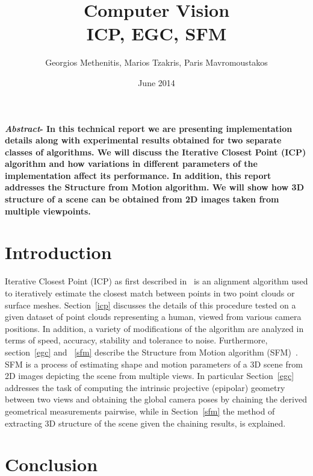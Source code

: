 \documentclass[11pt,twocolumn]{article}
\title{Computer Vision\\ICP, EGC, SFM}
\author{Georgios Methenitis, Marios Tzakris, Paris Mavromoustakos}
\affil{University of Amsterdam}
\date{June 2014}
\begin{document}
\maketitle

\renewcommand{\labelenumi}{\alph{enumi}.}

\textbf{\textit{Abstract}- In this technical report we are presenting implementation details along with experimental results obtained for two separate classes of algorithms. We will discuss the Iterative Closest Point (ICP) algorithm and how variations in different parameters of the implementation affect its performance. In addition, this report addresses the Structure from Motion algorithm. We will show how 3D structure of a scene can be obtained from 2D images taken from multiple viewpoints.}

\section{Introduction}
\label{introduction}
Iterative Closest Point (ICP) as first described in~\cite{icp} is an alignment algorithm used to iteratively estimate the closest match between points in two point clouds or surface meshes. Section~\ref{icp} discusses the details of this procedure tested on a given dataset of point clouds representing a human, viewed from various camera positions. In addition, a variety of modifications of the algorithm are analyzed in terms of speed, accuracy, stability and tolerance to noise.
Furthermore, section~\ref{egc} and ~\ref{sfm} describe the Structure from Motion algorithm (SFM)~\cite{egc}. SFM is a process of estimating shape and motion parameters of a 3D scene from 2D images depicting the scene from multiple views. In particular Section~\ref{egc} addresses the task of computing the intrinsic projective (epipolar) geometry between two views and obtaining the global camera poses by chaining the derived geometrical measurements pairwise, while in Section~\ref{sfm} the method of extracting 3D structure of the scene given the chaining results, is explained.











\section{Conclusion}
\label{conclusion}
\end{document}
